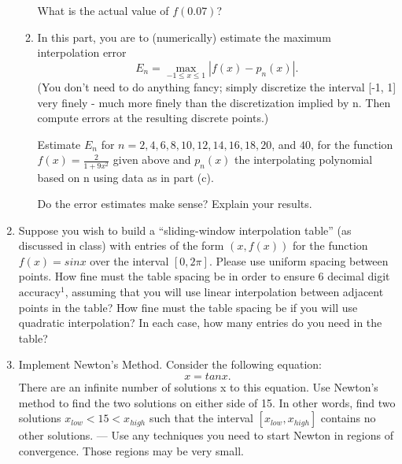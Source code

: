 \documentclass[conference,onecolumn]{IEEEtran}
\begin{document}
\begin{enumerate}[label=\arabic{enumi}.]
\begin{enumerate}
                    What is the actual value of $f(0.07)$?
              \item In this part, you are to (numerically) estimate the maximum interpolation error
                    $$
                        E_n = \max_{-1 \leq x \leq 1} |f(x) - p_n(x)|.
                    $$
                    (You don't need to do anything fancy; simply discretize the interval [-1, 1] very finely - much more finely than the discretization implied by n.
                    Then compute errors at the resulting discrete points.)

                    Estimate $E_n$ for $n = 2, 4, 6, 8, 10, 12, 14, 16, 18, 20$, and $40$, for the function $f(x) = \frac{2}{1 + 9 x^2}$ given above and $p_n(x)$ the interpolating polynomial based on n using data as in part (c).

                    Do the error estimates make sense? Explain your results.
          \end{enumerate}
          \clearpage
    \item Suppose you wish to build a “sliding-window interpolation table” (as discussed in class) with entries of the form $(x, f(x))$ for the function $f(x) = sin x$ over the interval $[0, 2\pi]$.
          Please use uniform spacing between points.
          How fine must the table spacing be in order to ensure 6 decimal digit $\text{accuracy}^1$, assuming that you will use linear interpolation between adjacent points in the table?
          How fine must the table spacing be if you will use quadratic interpolation?
          In each case, how many entries do you need in the table?

          \clearpage
    \item Implement Newton's Method. Consider the following equation:
          $$
              x = tan x.
          $$
          There are an infinite number of solutions x to this equation.
          Use Newton's method to find the two solutions on either side of 15.
          In other words, find two solutions $x_{low} < 15 < x_{high}$ such that the interval $[x_{low}, x_{high}]$ contains no other solutions. — Use any techniques you need to start Newton in regions of convergence.
          Those regions may be very small.


\end{enumerate}
\end{document}
